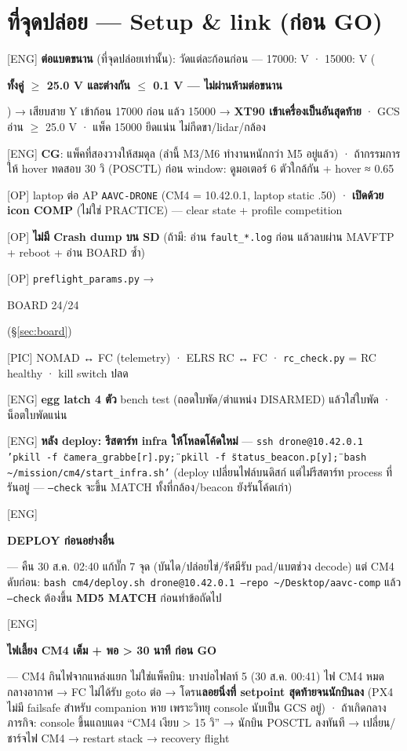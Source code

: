 \documentclass[11pt,a4paper]{article}
\newcommand{\code}[1]{\texttt{\small #1}}
\newcommand{\hl}[1]{\colorbox{hlyel}{\strut #1}}
\newcommand{\hlr}[1]{\colorbox{hlred}{\strut\color{stopred}\bfseries #1}}
\newcommand{\who}[1]{{\small\color{blu}[#1]}}
\begin{document}
\section{ที่จุดปล่อย — Setup \& link (ก่อน GO)}
\begin{cl}
\item \who{ENG} \textbf{ต่อแบตขนาน} (ที่จุดปล่อยเท่านั้น): วัดแต่ละก้อนก่อน — 17000: \underline{\hspace{1.2cm}} V · 15000: \underline{\hspace{1.2cm}} V (\hlr{ทั้งคู่ $\geq$ 25.0 V และต่างกัน $\leq$ 0.1 V — ไม่ผ่านห้ามต่อขนาน}) → เสียบสาย Y เข้าก้อน 17000 ก่อน แล้ว 15000 → \textbf{XT90 เข้าเครื่องเป็นอันสุดท้าย} · GCS อ่าน $\geq$ 25.0 V · แพ็ค 15000 ยึดแน่น ไม่กีดขา/lidar/กล้อง
\item \who{ENG} \textbf{CG}: แพ็คที่สองวางให้สมดุล (ลำนี้ M3/M6 ทำงานหนักกว่า M5 อยู่แล้ว) · ถ้ากรรมการให้ hover ทดสอบ 30 วิ (POSCTL) ก่อน window: ดูมอเตอร์ 6 ตัวใกล้กัน + hover ≈ 0.65
\item \who{OP} laptop ต่อ AP \code{AAVC-DRONE} (CM4 = 10.42.0.1, laptop static .50) · \textbf{เปิดด้วย icon COMP} (ไม่ใช่ PRACTICE) — clear state + profile competition
\item \who{OP} \textbf{ไม่มี Crash dump บน SD} (ถ้ามี: อ่าน \code{fault_*.log} ก่อน แล้วลบผ่าน MAVFTP + reboot + อ่าน BOARD ซ้ำ)
\item \who{OP} \code{preflight_params.py} → \hl{BOARD 24/24} (§\ref{sec:board})
\item \who{PIC} NOMAD ↔ FC (telemetry) · ELRS RC ↔ FC · \code{rc_check.py} = RC healthy · kill switch ปลด
\item \who{ENG} \textbf{egg latch 4 ตัว} bench test (ถอดใบพัด/ตำแหน่ง DISARMED) แล้วใส่ใบพัด · น็อตใบพัดแน่น
\item \who{ENG} \textbf{หลัง deploy: รีสตาร์ท infra ให้โหลดโค้ดใหม่} — \code{ssh drone@10.42.0.1 'pkill -f \"camera\_grabbe[r].py\"; pkill -f \"status\_beacon.p[y]\"; bash \textasciitilde/mission/cm4/start\_infra.sh'} (deploy เปลี่ยนไฟล์บนดิสก์ แต่ไม่รีสตาร์ท process ที่รันอยู่ — \code{--check} จะขึ้น MATCH ทั้งที่กล้อง/beacon ยังรันโค้ดเก่า)
\item \who{ENG} \hl{\textbf{DEPLOY ก่อนอย่างอื่น}} — คืน 30 ส.ค. 02:40 แก้บั๊ก 7 จุด (บันได/ปล่อยไข่/รัศมีรับ pad/แบตช่วง decode) แต่ CM4 ดับก่อน: \code{bash cm4/deploy.sh drone@10.42.0.1 --repo \textasciitilde/Desktop/aavc-comp} แล้ว \code{--check} ต้องขึ้น \textbf{MD5 MATCH} ก่อนทำข้อถัดไป
\item \who{ENG} \hl{\textbf{ไฟเลี้ยง CM4 เต็ม + พอ > 30 นาที ก่อน GO}} — CM4 กินไฟจากแหล่งแยก ไม่ใช่แพ็คบิน: บางบ่อไฟลท์ 5 (30 ส.ค. 00:41) ไฟ CM4 หมดกลางอากาศ → FC ไม่ได้รับ goto ต่อ → โดรน\textbf{ลอยนิ่งที่ setpoint สุดท้ายจนนักบินลง} (PX4 ไม่มี failsafe สำหรับ companion หาย เพราะวิทยุ console นับเป็น GCS อยู่) · ถ้าเกิดกลางภารกิจ: console ขึ้นแถบแดง ``CM4 เงียบ > 15 วิ'' → นักบิน POSCTL ลงทันที → เปลี่ยน/ชาร์จไฟ CM4 → restart stack → recovery flight

\end{cl}
\end{document}

